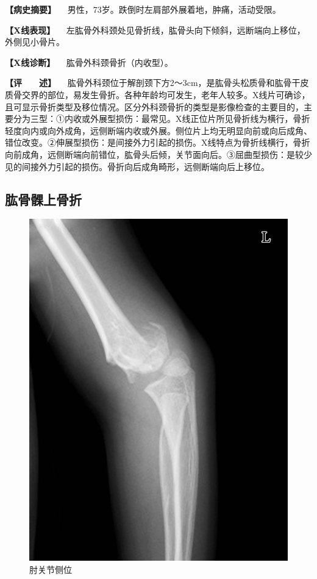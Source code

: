 \textbf{【病史摘要】}
　男性，73岁。跌倒时左肩部外展着地，肿痛，活动受限。

\textbf{【X线表现】}
　左肱骨外科颈处见骨折线，肱骨头向下倾斜，远断端向上移位，外侧见小骨片。

\textbf{【X线诊断】} 　肱骨外科颈骨折（内收型）。

\textbf{【评　　述】}
　肱骨外科颈位于解剖颈下方2～3cm，是肱骨头松质骨和肱骨干皮质骨交界的部位，易发生骨折。各种年龄均可发生，老年人较多。X线片可确诊，且可显示骨折类型及移位情况。区分外科颈骨折的类型是影像检查的主要目的，主要分为三型：①内收或外展型损伤：最常见。X线正位片所见骨折线为横行，骨折轻度向内或向外成角，远侧断端内收或外展。侧位片上均无明显向前或向后成角、错位改变。②伸展型损伤：是间接外力引起的损伤。X线特点为骨折线横行，骨折向前成角，远侧断端向前错位，肱骨头后倾，关节面向后。③屈曲型损伤：是较少见的间接外力引起的损伤。骨折向后成角畸形，远侧断端向后上移位。

\subsection{肱骨髁上骨折}

\begin{figure}[!htbp]
 \centering
 \includegraphics{./images/Image00031.jpg}
 \captionsetup{justification=centering}
 \caption{肘关节侧位}
 \label{fig2-3-4}
  \end{figure} 

